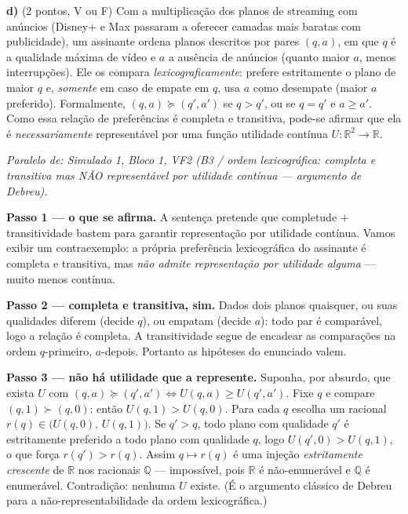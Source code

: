 \textbf{d)} (2 pontos, V ou F) Com a multiplicação dos planos de streaming com anúncios (Disney+ e Max passaram a oferecer camadas mais baratas com publicidade), um assinante ordena planos descritos por pares $(q,a)$, em que $q$ é a qualidade máxima de vídeo e $a$ a ausência de anúncios (quanto maior $a$, menos interrupções). Ele os compara \emph{lexicograficamente}: prefere estritamente o plano de maior $q$ e, \emph{somente} em caso de empate em $q$, usa $a$ como desempate (maior $a$ preferido). Formalmente, $(q,a)\succeq(q',a')$ se $q>q'$, ou se $q=q'$ e $a\ge a'$. Como essa relação de preferências é completa e transitiva, pode-se afirmar que ela é \emph{necessariamente} representável por uma função utilidade contínua $U:\mathbb{R}^2\to\mathbb{R}$.

\begin{solucao}
{\footnotesize\textit{Paralelo de: Simulado 1, Bloco 1, VF2 (B3 / ordem lexicográfica: completa e transitiva mas NÃO representável por utilidade contínua --- argumento de Debreu).}}\par\vspace{0.2em}
\textbf{Passo 1 --- o que se afirma.} A sentença pretende que completude $+$ transitividade bastem para garantir representação por utilidade contínua. Vamos exibir um contraexemplo: a própria preferência lexicográfica do assinante é completa e transitiva, mas \emph{não admite representação por utilidade alguma} --- muito menos contínua.

\textbf{Passo 2 --- completa e transitiva, sim.} Dados dois planos quaisquer, ou suas qualidades diferem (decide $q$), ou empatam (decide $a$): todo par é comparável, logo a relação é completa. A transitividade segue de encadear as comparações na ordem $q$-primeiro, $a$-depois. Portanto as hipóteses do enunciado valem.

\textbf{Passo 3 --- não há utilidade que a represente.} Suponha, por absurdo, que exista $U$ com $(q,a)\succeq(q',a')\iff U(q,a)\ge U(q',a')$. Fixe $q$ e compare $(q,1)\succ(q,0)$: então $U(q,1)>U(q,0)$. Para cada $q$ escolha um racional $r(q)\in\big(U(q,0),\,U(q,1)\big)$. Se $q'>q$, todo plano com qualidade $q'$ é estritamente preferido a todo plano com qualidade $q$, logo $U(q',0)>U(q,1)$, o que força $r(q')>r(q)$. Assim $q\mapsto r(q)$ é uma injeção \emph{estritamente crescente} de $\mathbb{R}$ nos racionais $\mathbb{Q}$ --- impossível, pois $\mathbb{R}$ é não-enumerável e $\mathbb{Q}$ é enumerável. Contradição: nenhuma $U$ existe. (É o argumento clássico de Debreu para a não-representabilidade da ordem lexicográfica.)


\end{solucao}
